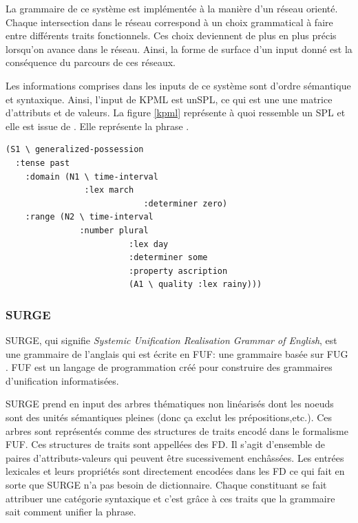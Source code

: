 La grammaire de ce système est implémentée à la manière d'un réseau orienté. Chaque intersection dans le réseau correspond à un choix grammatical à faire entre différents traits fonctionnels. Ces choix deviennent de plus en plus précis lorsqu'on avance dans le réseau. Ainsi, la forme de surface d'un input donné est la conséquence du parcours de ces réseaux.

Les informations comprises dans les inputs de ce système sont d'ordre sémantique et syntaxique. Ainsi, l'input de KPML est un\ac{SPL}, ce qui est une une matrice d'attributs et de valeurs. La figure \ref{kpml} représente à quoi ressemble un \ac{SPL} et elle est issue de \cite{ReiterBuildingNaturalLanguage2000}. Elle représente la phrase .

\begin{minipage}{\linewidth}
\begin{lstlisting}[language=Xml, caption=SPL: input de KPML, label=kpml]
(S1 \ generalized-possession
  :tense past 
	:domain (N1 \ time-interval
	            :lex march
							:determiner zero)
	:range (N2 \ time-interval
	           :number plural
						 :lex day
						 :determiner some
						 :property ascription
						 (A1 \ quality :lex rainy)))
\end{lstlisting}
\end{minipage}

\subsubsection{SURGE}
SURGE, qui signifie \emph{Systemic Unification Realisation Grammar of English}, est une grammaire de l'anglais \citep{Elhadad98surge:a} qui est écrite en \ac{FUF}: une grammaire basée sur \acf{FUG} \citep{KayFunctionalUnificationGrammar1984}. \ac{FUF} est un langage de programmation créé pour construire des grammaires d'unification informatisées.

SURGE prend en input des arbres thématiques non linéarisés dont les noeuds sont des unités sémantiques pleines (donc ça exclut les prépositions,etc.). Ces arbres sont représentés comme des structures de traits encodé dans le formalisme \ac{FUF}. Ces structures de traits sont appellées des \ac{FD}. Il s'agit d'ensemble de paires d'attributs-valeurs qui peuvent être sucessivement enchâssées. Les entrées lexicales et leurs propriétés sont directement encodées dans les \ac{FD} ce qui fait en sorte que SURGE n'a pas besoin de dictionnaire. Chaque constituant se fait attribuer une catégorie syntaxique et c'est grâce à ces traits que la grammaire sait comment unifier la phrase.

